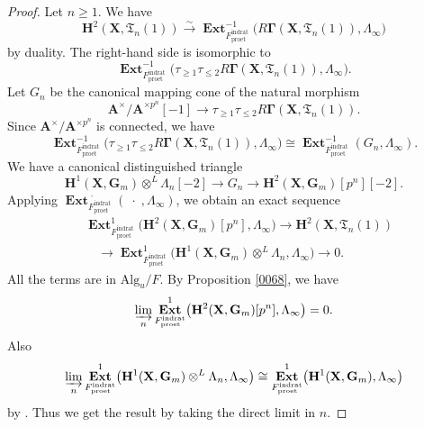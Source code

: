 \documentclass{amsart}
\theoremstyle{remark}
\numberwithin{equation}{section}
\newcommand{\isomto}{\overset{\sim}{\to}}
\newcommand{\tensor}{\mathbin{\otimes}}
\newcommand{\et}{\mathrm{et}}
\newcommand{\Gm}{\mathbf{G}_{m}}
\newcommand{\dirlim}{\varinjlim}
\newcommand{\rat}{\mathrm{rat}}
\newcommand{\ind}{\mathrm{ind}}
\newcommand{\pro}{\mathrm{pro}}
\newcommand{\Alg}{\mathrm{Alg}}
\newcommand{\alg}[1]{\mathbf{#1}}
\newcommand{\var}{\;\cdot\;}
\DeclareMathOperator{\sheafext}{\alg{Ext}}
\begin{document}
\begin{proof}
	Let $n \ge 1$.
	We have
		\[
				\alg{H}^{2}(\alg{X}, \mathfrak{T}_{n}(1))
			\isomto
				\sheafext^{-1}_{F^{\ind\rat}_{\pro\et}} \bigl(
					R \alg{\Gamma}(\alg{X}, \mathfrak{T}_{n}(1)),
					\Lambda_{\infty}
				\bigr)
		\]
	by duality.
	The right-hand side is isomorphic to
		\[
			\sheafext^{-1}_{F^{\ind\rat}_{\pro\et}} \bigl(
				\tau_{\ge 1} \tau_{\le 2}
				R \alg{\Gamma}(\alg{X}, \mathfrak{T}_{n}(1)),
				\Lambda_{\infty}
			\bigr).
		\]
	Let $G_{n}$ be the canonical mapping cone of the natural morphism
		\[
				\alg{A}^{\times} / \alg{A}^{\times p^{n}}[-1]
			\to
				\tau_{\ge 1} \tau_{\le 2}
				R \alg{\Gamma}(\alg{X}, \mathfrak{T}_{n}(1)).
		\]
	Since $\alg{A}^{\times} / \alg{A}^{\times p^{n}}$ is connected, we have
		\[
				\sheafext^{-1}_{F^{\ind\rat}_{\pro\et}} \bigl(
					\tau_{\ge 1} \tau_{\le 2}
					R \alg{\Gamma}(\alg{X}, \mathfrak{T}_{n}(1)),
					\Lambda_{\infty}
				\bigr)
			\cong
				\sheafext^{-1}_{F^{\ind\rat}_{\pro\et}}(G_{n}, \Lambda_{\infty}).
		\]
	We have a canonical distinguished triangle
		\[
				\alg{H}^{1}(\alg{X}, \Gm) \tensor^{L} \Lambda_{n}[-2]
			\to
				G_{n}
			\to
				\alg{H}^{2}(\alg{X}, \Gm)[p^{n}][-2].
		\]
	Applying $\sheafext^{\var}_{F^{\ind\rat}_{\pro\et}}(\var, \Lambda_{\infty})$,
	we obtain an exact sequence
		\begin{equation} \label{0069}
			\begin{split}
				&
						\sheafext^{1}_{F^{\ind\rat}_{\pro\et}} \bigl(
							\alg{H}^{2}(\alg{X}, \Gm)[p^{n}],
							\Lambda_{\infty}
						\bigr)
					\to
						\alg{H}^{2}(\alg{X}, \mathfrak{T}_{n}(1))
				\\
				&	\quad
					\to
						\sheafext^{1}_{F^{\ind\rat}_{\pro\et}} \bigl(
							\alg{H}^{1}(\alg{X}, \Gm) \tensor^{L} \Lambda_{n},
							\Lambda_{\infty}
						\bigr)
					\to
						0.
			\end{split}
		\end{equation}
	All the terms are in $\Alg_{u} / F$.
	By Proposition \ref{0068}, we have
		\[
				\dirlim_{n}
				\sheafext^{1}_{F^{\ind\rat}_{\pro\et}} \bigl(
					\alg{H}^{2}(\alg{X}, \Gm)[p^{n}],
					\Lambda_{\infty}
				\bigr)
			=
				0.
		\]
	Also
		\[
				\dirlim_{n}
				\sheafext^{1}_{F^{\ind\rat}_{\pro\et}} \bigl(
					\alg{H}^{1}(\alg{X}, \Gm) \tensor^{L} \Lambda_{n},
					\Lambda_{\infty}
				\bigr)
			\cong
				\sheafext^{1}_{F^{\ind\rat}_{\pro\et}} \bigl(
					\alg{H}^{1}(\alg{X}, \Gm),
					\Lambda_{\infty}
				\bigr)
		\]
	by \cite[Proposition (2.4.1) (d)]{Suz20}.
	Thus we get the result by taking the direct limit in $n$.
\end{proof}
\end{document}

